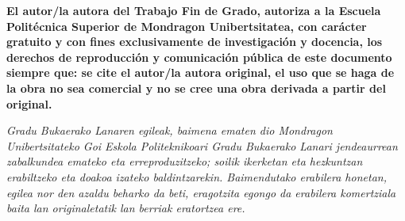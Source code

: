\documentclass[a4paper,openright,12pt]{report}
\begin{document}
\begin{titlepage}
\begin{scriptsize}

\noindent \textbf{El autor/la autora del Trabajo Fin de Grado, autoriza a la Escuela Polit\'ecnica Superior de Mondragon Unibertsitatea, con car\'acter gratuito y con fines exclusivamente de investigaci\'on y docencia, los derechos de reproducci\'on y comunicaci\'on p\'ublica de este documento siempre que: se cite el autor/la autora original, el uso que se haga de la obra no sea comercial y no se cree una obra derivada a partir del original.}

\vspace{0.2cm}

\noindent \textit{Gradu Bukaerako Lanaren egileak, baimena ematen dio Mondragon Unibertsitateko Goi Eskola Politeknikoari Gradu Bukaerako Lanari jendeaurrean zabalkundea emateko eta erreproduzitzeko; soilik ikerketan eta hezkuntzan erabiltzeko eta doakoa izateko baldintzarekin. Baimendutako erabilera honetan, egilea nor den azaldu beharko da beti, eragotzita egongo da erabilera komertziala baita lan originaletatik lan berriak eratortzea ere.}

\end{scriptsize}

\end{titlepage}
\end{document}
